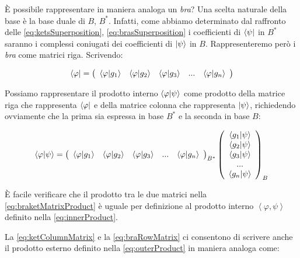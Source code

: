 È possibile rappresentare in maniera analoga un \textit{bra}? Una scelta naturale della base è la base duale di $B$, $B^*$. Infatti, come abbiamo determinato dal raffronto delle \eqref{eq:ketsSuperposition}, \eqref{eq:brasSuperposition} i coefficienti di $\bra{\psi}$ in $B^*$ saranno i complessi coniugati dei coefficienti di $\ket{\psi}$ in $B$. Rappresenteremo per\`o i \textit{bra} come matrici riga. Scrivendo:

	\begin{equation} \label{eq:braRowMatrix}
		\bra{\varphi} = \left ( \begin{array}{c c c c c}
			\braket{\varphi}{g_1} & \braket{\varphi}{g_2} & \braket{\varphi}{g_3} & ... & \braket{\varphi}{g_n}
		\end{array} \right )
	\end{equation}

Possiamo rappresentare il prodotto interno $\braket{\varphi}{\psi}$ come prodotto della matrice riga che rappresenta $\bra{\varphi}$ e della matrice colonna che rappresenta $\ket{\psi}$, richiedendo ovviamente che la prima sia espressa in base $B^*$ e la seconda in base $B$:

	\begin{equation} \label{eq:braketMatrixProduct}
		\braket{\varphi}{\psi} =
		\left ( \begin{array}{c c c c c}
			\braket{\varphi}{g_1} & \braket{\varphi}{g_2} & \braket{\varphi}{g_3} & ... & \braket{\varphi}{g_n}
		\end{array} \right )_{B^*}
		\left ( \begin{array}{c}
				\braket{g_1}{\psi} \\
				\braket{g_2}{\psi} \\
				\braket{g_3}{\psi} \\
				... \\
				\braket{g_n}{\psi}
			\end{array}
		\right )_B
	\end{equation}

È facile verificare che il prodotto tra le due matrici nella \eqref{eq:braketMatrixProduct} è uguale per definizione al prodotto interno $\left \langle \varphi, \psi \right \rangle$ definito nella \eqref{eq:innerProduct}.

La \eqref{eq:ketColumnMatrix} e la \eqref{eq:braRowMatrix} ci consentono di scrivere anche il prodotto esterno definito nella \eqref{eq:outerProduct} in maniera analoga come:

